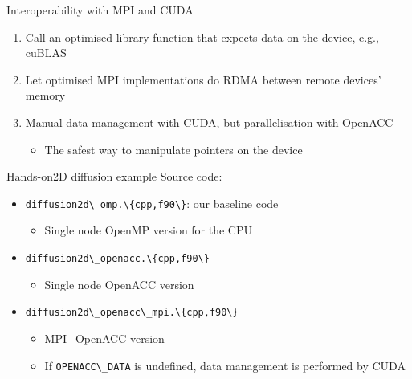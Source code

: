 \documentclass[12pt,aspectratio=169]{beamer}
\newcommand\shinline[2][]{\lstinline[style=shstyle,basicstyle=\ttfamily,#1]!#2!}
\begin{document}
\begin{frame}[fragile]{Interoperability with MPI and CUDA}
  \begin{enumerate}
  \item Call an optimised library function that expects data on the device, e.g., cuBLAS
  \item Let optimised MPI implementations do RDMA between remote devices' memory
  \item Manual data management with CUDA, but parallelisation with OpenACC
    \begin{itemize}
    \item The safest way to manipulate pointers on the device
    \end{itemize}
  \end{enumerate}
\end{frame}

\begin{frame}[fragile]{Hands-on}{2D diffusion example}
  Source code:
  \begin{itemize}
  \item \shinline{diffusion2d\_omp.\{cpp,f90\}}: our baseline code
    \begin{itemize}
    \item Single node OpenMP version for the CPU
    \end{itemize}
  \item \shinline{diffusion2d\_openacc.\{cpp,f90\}}
    \begin{itemize}
    \item Single node OpenACC version
    \end{itemize}
  \item \shinline{diffusion2d\_openacc\_mpi.\{cpp,f90\}}
    \begin{itemize}
    \item MPI+OpenACC version
    \item If \shinline{OPENACC\_DATA} is undefined, data management is performed by CUDA
    \end{itemize}
  \end{itemize}
\end{frame}
\end{document}
